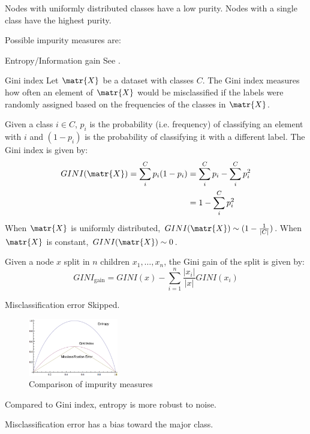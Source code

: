 \begin{description}
        Nodes with uniformly distributed classes have a low purity.
        Nodes with a single class have the highest purity.

        Possible impurity measures are:
        \begin{descriptionlist}
            \item[Entropy/Information gain] See . 

            \item[Gini index] 
                Let $\matr{X}$ be a dataset with classes $C$.
                The Gini index measures how often an element of $\matr{X}$ would be misclassified
                if the labels were randomly assigned based on the frequencies of the classes in $\matr{X}$.

                Given a class $i \in C$, $p_i$ is the probability (i.e. frequency) of classifying an element with $i$ and
                $(1 - p_i)$ is the probability of classifying it with a different label.
                The Gini index is given by:
                \[
                    \begin{split}
                        GINI(\matr{X}) = \sum_i^C p_i (1-p_i) &= \sum_i^C p_i - \sum_i^C p_i^2 \\
                            &= 1 - \sum_i^C p_i^2
                    \end{split}  
                \]
                When $\matr{X}$ is uniformly distributed, $GINI(\matr{X}) \sim (1-\frac{1}{\vert C \vert})$.
                When $\matr{X}$ is constant, $GINI(\matr{X}) \sim 0$.

                Given a node $x$ split in $n$ children $x_1, \dots, x_n$,
                the Gini gain of the split is given by:
                \[ GINI_\text{gain} = GINI(x) - \sum_{i=1}^n \frac{\vert x_i \vert}{\vert x \vert} GINI(x_i) \]
 
            \item[Misclassification error] 
                Skipped.
        \end{descriptionlist}

        \begin{figure}[h]
            \centering
            \includegraphics[width=0.35\textwidth]{img/impurity_comparison.png}
            \caption{Comparison of impurity measures}
        \end{figure}

        Compared to Gini index, entropy is more robust to noise.

        Misclassification error has a bias toward the major class.
\end{description}

